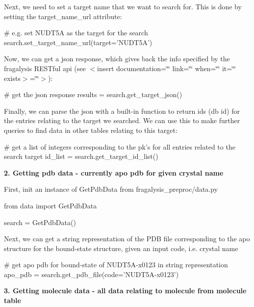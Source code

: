 Next, we need to set a target name that we want to search for. This is done by setting the target\+\_\+name\+\_\+url attribute\+:


\begin{DoxyCode}
# e.g. set NUDT5A as the target for the search
search.set\_target\_name\_url(target='NUDT5A')
\end{DoxyCode}


Now, we can get a json response, which gives back the info specified by the fragalysis R\+E\+S\+Tful api (see $<$insert documentation=\char`\"{}\char`\"{} link=\char`\"{}\char`\"{} when=\char`\"{}\char`\"{} it=\char`\"{}\char`\"{} exists$>$=\char`\"{}\char`\"{}$>$)\+:


\begin{DoxyCode}
# get the json response
results = search.get\_target\_json()
\end{DoxyCode}


Finally, we can parse the json with a built-\/in function to return id\textquotesingle{}s (db id) for the entries relating to the target we searched. We can use this to make further queries to find data in other tables relating to this target\+:


\begin{DoxyCode}
# get a list of integers corresponding to the pk's for all entries related to the search target
id\_list = search.get\_target\_id\_list()
\end{DoxyCode}


{\bfseries 2. Getting pdb data -\/ currently apo pdb for given crystal name}

First, init an instance of Get\+Pdb\+Data from fragalysis\+\_\+preproc/data.\+py


\begin{DoxyCode}
from data import GetPdbData

search = GetPdbData()
\end{DoxyCode}


Next, we can get a string representation of the P\+DB file corresponding to the apo structure for the bound-\/state structure, given an input \textquotesingle{}code\textquotesingle{}, i.\+e. crystal name


\begin{DoxyCode}
# get apo pdb for bound-state of NUDT5A-x0123 in string representation
apo\_pdb = search.get\_pdb\_file(code='NUDT5A-x0123')
\end{DoxyCode}


{\bfseries 3. Getting molecule data -\/ all data relating to molecule from molecule table}

